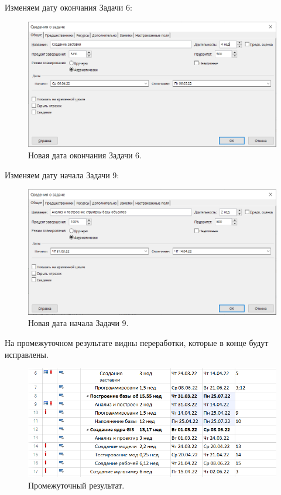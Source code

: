 \documentclass[a4paper,14pt]{extreport} %
\begin{document}
\begin{enumerate}
\newpage

Изменяем дату окончания Задачи 6:
\begin{figure}[H]
	\centering
	\caption{Новая дата окончания Задачи 6. }
	\includegraphics[scale=0.7]{delay-task6V2}
\end{figure}

Изменяем дату начала Задачи 9:
\begin{figure}[H]
	\centering
	\caption{Новая дата начала Задачи 9. }
	\includegraphics[scale=0.7]{delay-task9V2}
\end{figure}

На промежуточном результате видны переработки, которые в конце будут исправлены.
\begin{figure}[H]
	\centering
	\caption{Промежуточный результат. }
	\includegraphics[scale=0.8]{delay-results}
\end{figure}


\end{enumerate}
\end{document}
